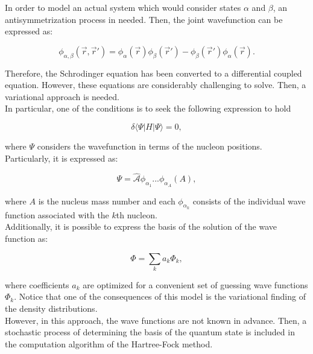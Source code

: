 \documentclass[openany]{book}
\begin{document}
In order to model an actual system which would consider states $\alpha$ and $\beta$, an antisymmetrization process in needed. Then, the joint wavefunction can be expressed as: 

\begin{equation}\label{eq:micro_hartreeFock_antisymmetrization}
	\phi_{\alpha, \beta}(\vec r, \vec r') = \phi_\alpha (\vec r) \phi_\beta  (\vec r' ) - \phi_\beta (\vec r') \phi_\alpha  (\vec r ). 
\end{equation}

Therefore, the Schrodinger equation has been converted to a differential coupled equation. However, these equations are considerably challenging to solve. Then, a variational approach is needed. \\

In particular, one of the conditions is to seek the following expression to hold

\begin{equation} \label{eq:micro_hartreeFock_optimal}
	\delta \langle \Psi | H | \Psi \rangle = 0,
\end{equation}

where $\Psi$ considers the wavefunction in terms of the nucleon positions. Particularly, it is expressed as: 

\begin{equation} \label{eq:micro_hartreeFock_Psi}
	\Psi = \hat{\mathcal{A}}  \phi_{\alpha_1} ...  \phi_{\alpha_A} (A),
\end{equation}

where $A$ is the nucleus mass number and each $\phi_{\alpha_k}$ consists of the individual wave function associated with the $k$th nucleon. \\

Additionally, it is possible to express the basis of the solution of the wave function as: 

\begin{equation} \label{eq:micro_hartreeFock_basis}
	\Phi = \sum_{k} a_k \Phi_k,
\end{equation}

where coefficients $a_k$ are optimized for a convenient set of guessing wave functions $\Phi_k$. Notice that one of the consequences of this model is the variational finding of the density distributions.   \\


However, in this approach, the wave functions are not known in advance. Then, a stochastic process of determining the basis of the quantum state is included in the computation algorithm of the Hartree-Fock method. \\
\end{document}
